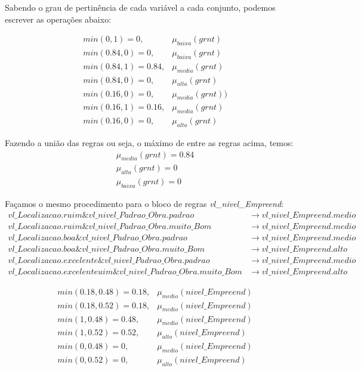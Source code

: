 \documentclass[12pt]{article}
\begin{document}
Sabendo o grau de pertinência de cada variável a cada conjunto, podemos escrever as operações abaixo:

\begin{align*}
	min(0,1)=0,&\mu_{baixa}(grnt)\\
	min(0.84,0)=0,&\mu_{baixa}(grnt)\\
	min(0.84,1)=0.84,&\mu_{media}(grnt)\\
	min(0.84,0)=0,&\mu_{alta}(grnt)\\
	min(0.16,0)=0,&\mu_{media}(grnt))\\
	min(0.16,1)=0.16,&\mu_{media}(grnt)\\
	min(0.16,0)=0,&\mu_{alta}(grnt)
\end{align*}


Fazendo a união das regras ou seja, o máximo de entre as regras acima, temos:
\begin{align*}
	\mu_{media}(grnt)=0.84\\
	\mu_{alta}(grnt)=0\\
	\mu_{baixa}(grnt)=0
\end{align*}

Façamos o mesmo procedimento para o bloco de regras \textit{vl\_nivel\_Empreend}:
\begin{align*}
	vl\_Localizacao.ruim\&vl\_nivel\_Padrao\_Obra.padrao&\to vl\_nivel\_Empreend.medio\\
	vl\_Localizacao.ruim\&vl\_nivel\_Padrao\_Obra.muito\_Bom&\to vl\_nivel\_Empreend.medio\\
	vl\_Localizacao.boa\&vl\_nivel\_Padrao\_Obra.padrao&\to vl\_nivel\_Empreend.medio\\
	vl\_Localizacao.boa\&vl\_nivel\_Padrao\_Obra.muito\_Bom&\to vl\_nivel\_Empreend.alto\\
	vl\_Localizacao.excelente\&vl\_nivel\_Padrao\_Obra.padrao&\to vl\_nivel\_Empreend.medio\\
	vl\_Localizacao.excelenteuim\&vl\_nivel\_Padrao\_Obra.muito\_Bom&\to vl\_nivel\_Empreend.alto
\end{align*}

\begin{align*}
	min(0.18,0.48)=0.18,&\mu_{medio}(nivel\_Empreend)\\
	min(0.18,0.52)=0.18,&\mu_{medio}(nivel\_Empreend)\\
	min(1,0.48)=0.48,&\mu_{medio}(nivel\_Empreend)\\
	min(1,0.52)=0.52,&\mu_{alto}(nivel\_Empreend)\\
	min(0,0.48)=0,&\mu_{medio}(nivel\_Empreend)\\
	min(0,0.52)=0,&\mu_{alto}(nivel\_Empreend)
\end{align*}
\end{document}
